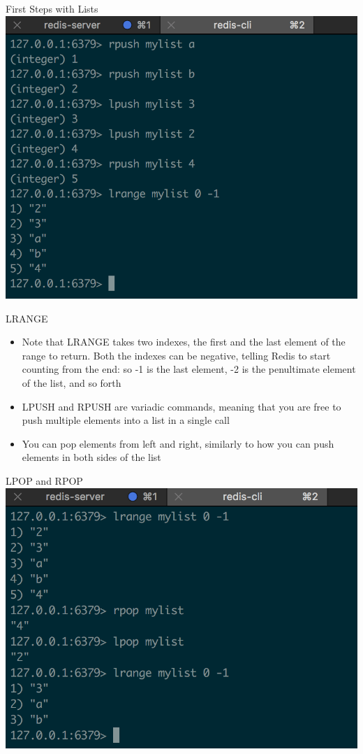 \documentclass[10pt]{beamer}
\begin{document}
\begin{frame}[fragile]{First Steps with Lists}
  \includegraphics[scale=0.7]{img/lpush-rpush-lrange}
\end{frame}

\begin{frame}[fragile]{LRANGE}
  \begin{itemize}
    \item Note that LRANGE takes two indexes, the first and the last element
    of the range to return. Both the indexes can be negative, telling Redis to
    start counting from the end: so -1 is the last element, -2 is the
    penultimate element of the list, and so forth
    \item LPUSH and RPUSH are variadic commands, meaning that you are free to
    push multiple elements into a list in a single call
    \item You can pop elements from left and right, similarly to how you can
    push elements in both sides of the list
  \end{itemize}
\end{frame}

\begin{frame}[fragile]{LPOP and RPOP}
  \includegraphics[scale=0.8]{img/pop}
\end{frame}
\end{document}
